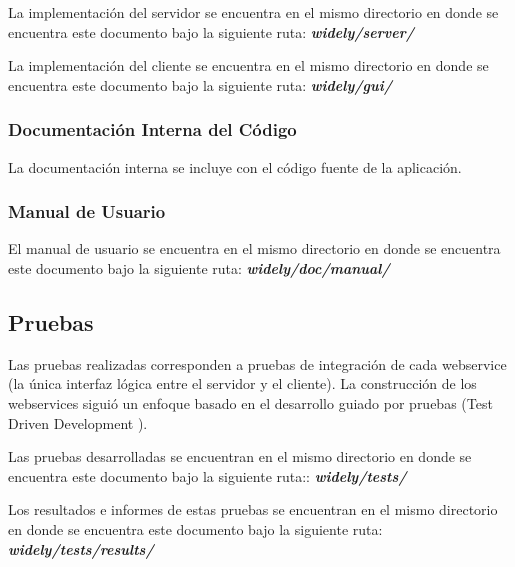 La implementación del servidor se encuentra en el mismo directorio en donde se encuentra este documento bajo la siguiente ruta: \textit{\textbf{widely/server/}}

La implementación del cliente se encuentra en el mismo directorio en donde se encuentra este documento bajo la siguiente ruta: \textit{\textbf{widely/gui/}}


\subsubsection{Documentación Interna del Código}

La documentación interna se incluye con el código fuente de la aplicación.


\subsubsection{Manual de Usuario}

El manual de usuario se encuentra en el mismo directorio en donde se encuentra este documento bajo la siguiente ruta: \textit{\textbf{widely/doc/manual/}}


\subsection{Pruebas}

Las pruebas realizadas corresponden a pruebas de integración de cada webservice (la única interfaz lógica entre el servidor y el cliente). La construcción de los webservices siguió un enfoque basado en el desarrollo guiado por pruebas (Test Driven Development \cite{tdd}).

Las pruebas desarrolladas se encuentran en el mismo directorio en donde se encuentra este documento bajo la siguiente ruta:: \textit{\textbf{widely/tests/}}

Los resultados e informes de estas pruebas se encuentran en el mismo directorio en donde se encuentra este documento bajo la siguiente ruta: \textit{\textbf{widely/tests/results/}}

